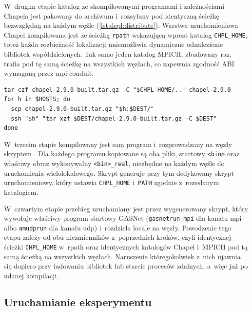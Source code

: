 W~drugim etapie katalog ze skompilowanymi programami i zależnościami Chapela jest pakowany do archiwum i~rozsyłany pod identyczną ścieżkę bezwzględną na każdym węźle (\cref{lst:depl:distribute}). Warstwa uruchomieniowa Chapel kompilowana jest ze ścieżką \texttt{rpath} wskazującą wprost katalog \texttt{CHPL\_HOME}, toteż każda rozbieżność lokalizacji uniemożliwia dynamiczne odnalezienie bibliotek współdzielonych. Tak samo jeden katalog MPICH, zbudowany raz, trafia pod tę samą ścieżkę na wszystkich węzłach, co zapewnia zgodność ABI wymaganą przez mpi-conduit.

\begin{lstlisting}[style=bash, caption={Spakowanie i~rozesłanie zbudowanego katalogu pod identyczną ścieżkę.}, label={lst:depl:distribute}]
tar czf chapel-2.9.0-built.tar.gz -C "$CHPL_HOME/.." chapel-2.9.0
for h in $HOSTS; do
  scp chapel-2.9.0-built.tar.gz "$h:$DEST/"
  ssh "$h" "tar xzf $DEST/chapel-2.9.0-built.tar.gz -C $DEST"
done
\end{lstlisting}

W~trzecim etapie kompilowany jest sam program i~rozprowadzany na węzły skryptem . Dla każdego programu kopiowane są oba pliki, startowy \texttt{<bin>} oraz właściwy obraz wykonywalny \texttt{<bin>\_real}, niezbędne na każdym węźle do uruchomienia wielolokalowego. Skrypt generuje przy tym dedykowany skrypt uruchomieniowy, który ustawia \texttt{CHPL\_HOME} i~\texttt{PATH} zgodnie z~rozesłanym katalogiem.

W~czwartym etapie przebieg uruchamiany jest przez wygenerowany skrypt, który wywołuje właściwy program startowy GASNet (\texttt{gasnetrun\_mpi} dla kanału mpi albo \texttt{amudprun} dla kanału udp) i~rozdziela locale na węzły. Powodzenie tego etapu zależy od obu niezmienników z~poprzednich kroków, czyli identycznej ścieżki \texttt{CHPL\_HOME} w~rpath oraz identycznych katalogów Chapel i~MPICH pod tą samą ścieżką na wszystkich węzłach. Naruszenie któregokolwiek z~nich ujawnia się dopiero przy ładowaniu bibliotek lub starcie procesów zdalnych, a~więc już po udanej kompilacji.

\subsection{Uruchamianie eksperymentu}
\label{sec:uruchamianie}

